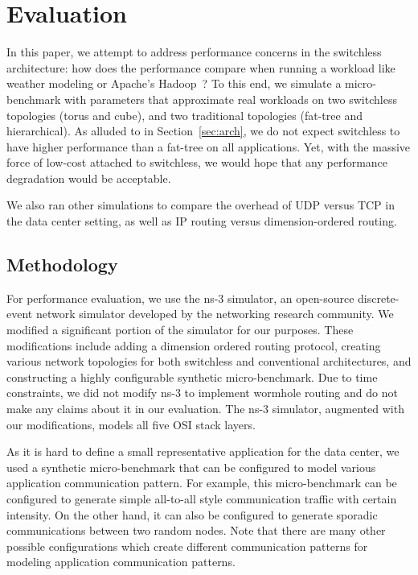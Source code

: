 \vspace{-0.1in}
\section{Evaluation}
\label{sec:eval}
In this paper, we attempt to address performance concerns in the switchless architecture: how does the performance compare when running a workload like weather modeling or Apache's Hadoop~\cite{Apache:Hadoop}? To this end, we simulate a micro-benchmark with parameters that approximate real workloads on two switchless topologies (torus and cube), and two traditional topologies (fat-tree and hierarchical). As alluded to in Section~\ref{sec:arch}, we do not expect switchless to have higher performance than a fat-tree on all applications. Yet, with the massive force of low-cost attached to switchless, we would hope that any performance degradation would be acceptable.

We also ran other simulations to compare the overhead of UDP versus TCP in the data center setting, as well as IP routing versus dimension-ordered routing.

\subsection {Methodology}
For performance evaluation, we use the ns-3 simulator\cite{Ns3:Online}, an open-source discrete-event network simulator developed by the networking research community. We modified a significant portion of the simulator for our purposes. These modifications include adding a dimension ordered routing protocol, creating various network topologies for both switchless and conventional architectures, and constructing a highly configurable synthetic micro-benchmark.  Due to time constraints, we did not modify ns-3 to implement wormhole routing and do not make any claims about it in our evaluation.  The ns-3 simulator, augmented with our modifications, models all five OSI stack layers.

As it is hard to define a small representative application for the data center, we used a synthetic micro-benchmark that can be configured to model various application communication pattern. For example, this micro-benchmark can be configured to generate simple all-to-all style communication traffic with certain intensity. On the other hand, it can also be configured to generate sporadic communications between two random nodes. Note that there are many other possible configurations which create different communication patterns for modeling application communication patterns.


